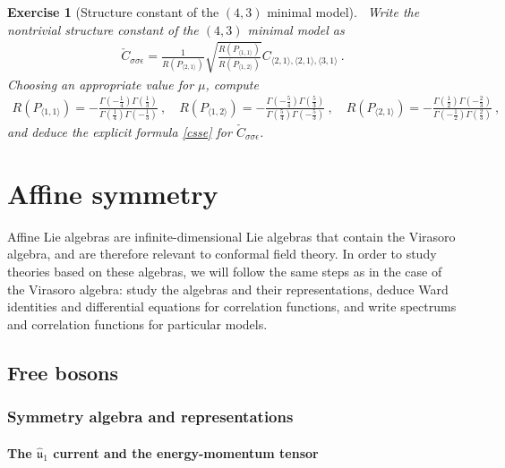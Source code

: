 \documentclass[12pt, a4paper, notitlepage, twoside]{report}
\numberwithin{equation}{section}
\theoremstyle{break}
\newtheorem{exo}{Exercise}[chapter]
\begin{document}
\begin{exo}[Structure constant of the $(4,3)$ minimal model]
 ~\label{exocsse}
Write the nontrivial structure constant of the $(4,3)$ minimal model as
\begin{align}
 \check{C}_{\sigma\sigma\epsilon} = \frac{1}{R(P_{\langle 2,1 \rangle})}\sqrt{\frac{R(P_{\langle 1,1 \rangle})}{R(P_{\langle 1,2 \rangle})}} C_{\langle 2,1\rangle , \langle 2,1 \rangle,\langle 3,1 \rangle}\ .
\end{align}
Choosing an appropriate value for $\mu$, compute
\begin{align}
 R(P_{\langle 1,1 \rangle}) = -\frac{\Gamma(-\frac14)\Gamma(\frac13)}{\Gamma(\frac14)\Gamma(-\frac13)} \ , \quad R(P_{\langle 1,2 \rangle}) = -\frac{\Gamma(-\frac54)\Gamma(\frac53)}{\Gamma(\frac54)\Gamma(-\frac53)} \ , \quad R(P_{\langle 2,1 \rangle}) = -\frac{\Gamma(\frac12)\Gamma(-\frac23)}{\Gamma(-\frac12)\Gamma(\frac23)}\ ,
\end{align}
and deduce the explicit formula \eqref{csse} for $\check{C}_{\sigma\sigma\epsilon}$.
\end{exo}


\chapter{Affine symmetry \label{secaff}}

Affine Lie algebras are infinite-dimensional Lie algebras that contain the Virasoro algebra, and are therefore relevant to conformal field theory.
In order to study theories based on these algebras, we will follow the same steps as in the case of the Virasoro algebra: study the algebras and their representations, deduce Ward identities and differential equations for correlation functions, and write spectrums and correlation functions for particular models. 

\section{Free bosons}

\subsection{Symmetry algebra and representations \label{secaua}}

\subsubsection{The \boldmath $\hat{\mathfrak{u}}_1$ current and the energy-momentum tensor}
\end{document}
